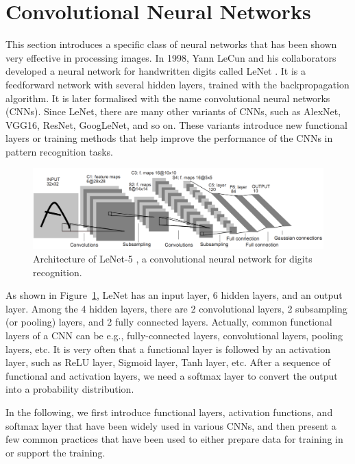 \section{Convolutional Neural Networks}

This section introduces a specific class of neural networks that has been shown very effective in processing images. 
%
In 1998, Yann LeCun and his collaborators developed a neural network for handwritten digits called LeNet \cite{726791}. It is a feedforward network with several hidden layers, trained with the backpropagation algorithm. It is later formalised with the name  convolutional neural networks (CNNs). Since LeNet, there are many other variants of CNNs, such as AlexNet, VGG16, ResNet, GoogLeNet, and so on. These variants introduce new functional layers or training methods that help improve the performance of the CNNs in pattern recognition tasks. 


\begin{figure}[!htbp]
    \centering
    \includegraphics[width=\textwidth]{images/deepLearning/CNN/LeNet.png}
    \caption{Architecture of LeNet-5 \cite{726791}, a convolutional neural network for digits recognition. }
    \label{fig:LeNet}
\end{figure}


As shown in Figure~\ref{fig:LeNet}, LeNet has an input layer, 6 hidden layers, and an output layer. Among the 4 hidden layers, there are 2 convolutional layers, 2 subsampling (or pooling) layers, and 2 fully connected layers. 
%
Actually, common functional layers of a CNN can be e.g., fully-connected layers, convolutional layers, pooling layers, etc. It is very often that a functional layer is followed by an activation layer, such as ReLU layer, Sigmoid layer, Tanh layer, etc. After a sequence of functional and activation layers, we need a softmax layer to convert the output into a probability distribution. 

In the following, we first introduce functional layers, activation functions, and softmax layer that have been widely used in various CNNs, and then present a few common practices that have been used to either prepare data for training in or support the training. 



